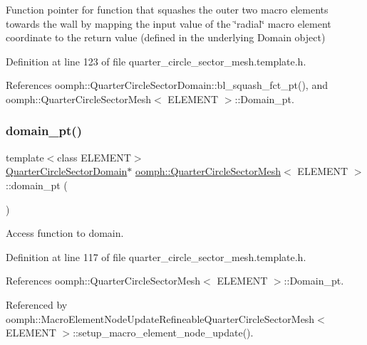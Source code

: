 Function pointer for function that squashes the outer two macro elements towards the wall by mapping the input value of the \char`\"{}radial\char`\"{} macro element coordinate to the return value (defined in the underlying Domain object) 



Definition at line 123 of file quarter\+\_\+circle\+\_\+sector\+\_\+mesh.\+template.\+h.



References oomph\+::\+Quarter\+Circle\+Sector\+Domain\+::bl\+\_\+squash\+\_\+fct\+\_\+pt(), and oomph\+::\+Quarter\+Circle\+Sector\+Mesh$<$ E\+L\+E\+M\+E\+N\+T $>$\+::\+Domain\+\_\+pt.

\mbox{\label{classoomph_1_1QuarterCircleSectorMesh_a53adafee1a15301fe99a481b641df45b}} 
\subsubsection{\texorpdfstring{domain\+\_\+pt()}{domain\_pt()}}
{\footnotesize\ttfamily template$<$class E\+L\+E\+M\+E\+NT$>$ \\
\hyperlink{classoomph_1_1QuarterCircleSectorDomain}{Quarter\+Circle\+Sector\+Domain}$\ast$ \hyperlink{classoomph_1_1QuarterCircleSectorMesh}{oomph\+::\+Quarter\+Circle\+Sector\+Mesh}$<$ E\+L\+E\+M\+E\+NT $>$\+::domain\+\_\+pt (\begin{DoxyParamCaption}{ }\end{DoxyParamCaption})\hspace{0.3cm}{\ttfamily [inline]}}



Access function to domain. 



Definition at line 117 of file quarter\+\_\+circle\+\_\+sector\+\_\+mesh.\+template.\+h.



References oomph\+::\+Quarter\+Circle\+Sector\+Mesh$<$ E\+L\+E\+M\+E\+N\+T $>$\+::\+Domain\+\_\+pt.



Referenced by oomph\+::\+Macro\+Element\+Node\+Update\+Refineable\+Quarter\+Circle\+Sector\+Mesh$<$ E\+L\+E\+M\+E\+N\+T $>$\+::setup\+\_\+macro\+\_\+element\+\_\+node\+\_\+update().


